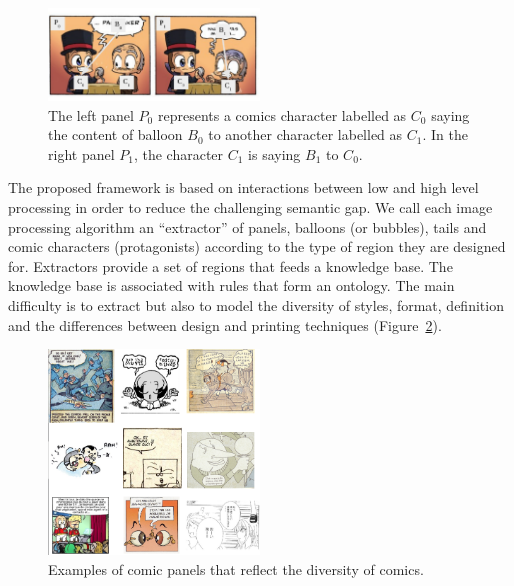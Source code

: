  \begin{figure}[ht]  %
   \centering
  \includegraphics[trim= 0px 10px 3px 10px, clip, width=0.5\textwidth]{intro_illustration.pdf}
  \caption{The left panel $P_0$ represents a comics character labelled as $C_0$ saying the content of balloon $B_0$ to another character labelled as $C_1$. In the right panel $P_1$, the character $C_1$ is saying $B_1$ to $C_0$.}
  \label{fig:kn:intro_illustration}
 \end{figure}


The proposed framework is based on interactions between low and high level processing in order to reduce the challenging semantic gap.
We call each image processing algorithm an ``extractor'' of panels, balloons (or bubbles), tails and comic characters (protagonists) according to the type of region they are designed for.
Extractors provide a set of regions that feeds a knowledge base.
The knowledge base is associated with rules that form an ontology.
The main difficulty is to extract but also to model the diversity of styles, format, definition and the differences between design and printing techniques (Figure~\ref{fig:kn:comics_diversity}).

\begin{figure}[ht]  %
   \centering
  \includegraphics[trim= 4px 0px 0px 0px, clip, width=0.5\textwidth]{comics_diversity.png}
  \caption{Examples of comic panels that reflect the diversity of comics.}
  \label{fig:kn:comics_diversity}
 \end{figure}

